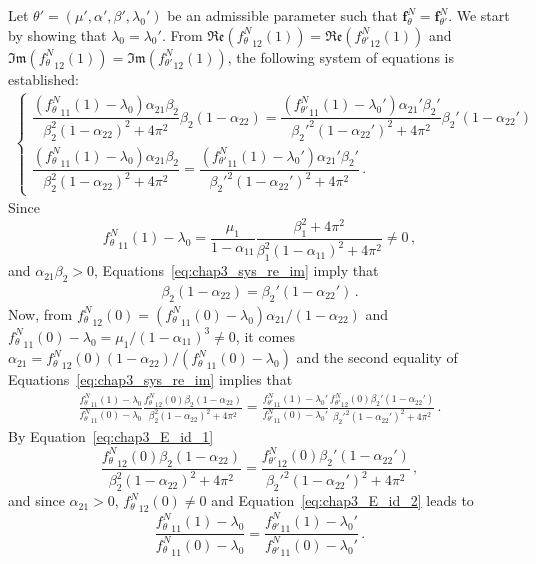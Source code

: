 \begin{subappendices}
Let $\theta' = (\mu', \alpha', \beta', \lambda_0')$ be an admissible parameter such that $\mathbf{f}_{\theta}^N = \mathbf{f}_{\theta'}^N$.
We start by showing that $\lambda_0 = \lambda_0'$.
From $\mathfrak{Re} \left( {f_\theta^N}_{12}(1) \right) = \mathfrak{Re} \left({f_{\theta'}^N}_{12}(1) \right)$ and $\mathfrak{Im} \left( {f_\theta^N}_{12}(1) \right) = \mathfrak{Im} \left( {f_{\theta'}^N}_{12}(1) \right)$,
the following system of equations is established:
\begin{align}\label{eq:chap3_sys_re_im}
\begin{cases}
\dfrac{({f_\theta^N}_{11}(1) - \lambda_0)\alpha_{21} \beta_2}{\beta_2^2(1-\alpha_{22})^2 + 4\pi^2} \beta_2(1-\alpha_{22}) = \dfrac{({f_{\theta'}^N}_{11}(1) - \lambda_0')\alpha_{21}' \beta_2'}{{\beta_2'}^2(1-\alpha_{22}')^2 + 4\pi^2} \beta_2'(1-\alpha_{22}') \\
\dfrac{({f_\theta^N}_{11}(1) - \lambda_0)\alpha_{21} \beta_2}{\beta_2^2(1-\alpha_{22})^2 + 4\pi^2} = \dfrac{({f_{\theta'}^N}_{11}(1) - \lambda_0')\alpha_{21}' \beta_2'}{ {\beta_2'}^2(1-\alpha_{22}')^2 + 4\pi^2}\,.
\end{cases}
\end{align}
Since
\[
{f_\theta^N}_{11}(1) - \lambda_0 = \frac{\mu_1}{1-\alpha_{11}}\frac{\beta_1^2 + 4 \pi^2}{\beta_1^2(1-\alpha_{11})^2 + 4\pi^2} \neq 0 \,,
\]
and $\alpha_{21} \beta_2 > 0$,
Equations~\eqref{eq:chap3_sys_re_im} imply that
\begin{align}\label{eq:chap3_E_id_1}
\beta_2(1-\alpha_{22}) = \beta_2'(1-\alpha_{22}') \,.
\end{align}
Now, from ${f_\theta^N}_{12}(0) = \left( {f_\theta^N}_{11}(0) - \lambda_0 \right) \alpha_{21} / (1-\alpha_{22})$
and ${f_\theta^N}_{11}(0) - \lambda_0 = \mu_1 / (1-\alpha_{11})^3 \neq 0$,
it comes $\alpha_{21} = {f_\theta^N}_{12}(0) (1-\alpha_{22}) / \left( {f_\theta^N}_{11}(0) - \lambda_0 \right)$ and the second equality of Equations~\eqref{eq:chap3_sys_re_im} implies that
\begin{align}\label{eq:chap3_E_id_2}
\frac{{f_\theta^N}_{11}(1) - \lambda_0}{{f_\theta^N}_{11}(0) - \lambda_0} \frac{{f_\theta^N}_{12}(0)\beta_2(1-\alpha_{22})}{\beta_2^2(1-\alpha_{22})^2 + 4\pi^2} = \frac{{f_{\theta'}^N}_{11}(1) - \lambda_0'}{{f_{\theta'}^N}_{11}(0) - \lambda_0'} \frac{{f_{\theta'}^N}_{12}(0){\beta_2'}(1-\alpha_{22}')}{{\beta_2'}^2(1-\alpha_{22}')^2 + 4\pi^2}\,.
\end{align}
By Equation~\eqref{eq:chap3_E_id_1}
\[
\frac{{f_\theta^N}_{12}(0)\beta_2(1-\alpha_{22})}{\beta_2^2(1-\alpha_{22})^2 + 4\pi^2} = \frac{{f_{\theta'}^N}_{12}(0){\beta_2'}(1-\alpha_{22}')}{{\beta_2'}^2(1-\alpha_{22}')^2 + 4\pi^2}\,,
\]
and since $\alpha_{21} > 0$, ${f_\theta^N}_{12}(0) \neq 0$ and Equation~\eqref{eq:chap3_E_id_2} leads to
\[
\frac{{f_\theta^N}_{11}(1) - \lambda_0}{{f_\theta^N}_{11}(0) - \lambda_0} = \frac{{f_{\theta'}^N}_{11}(1) - \lambda_0'}{{f_{\theta'}^N}_{11}(0) - \lambda_0'}\,.
\]


\end{subappendices}
